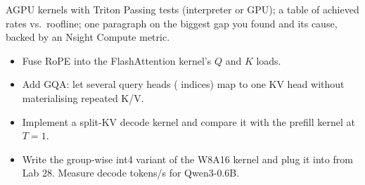 \begin{labbox}{A}{GPU kernels with Triton}
Passing tests (interpreter or GPU); a table of achieved rates vs.\ roofline; one
paragraph on the biggest gap you found and its cause, backed by an Nsight Compute
metric.

\begin{itemize}
  \item Fuse RoPE into the FlashAttention kernel's $Q$ and $K$ loads.
  \item Add GQA: let several query heads ( indices) map to one KV head without
        materialising repeated K/V.
  \item Implement a split-KV decode kernel and compare it with the prefill kernel at $T=1$.
  \item Write the group-wise int4 variant of the W8A16 kernel and plug it into
         from Lab 28. Measure decode tokens/s for Qwen3-0.6B.
\end{itemize}
\end{labbox}
